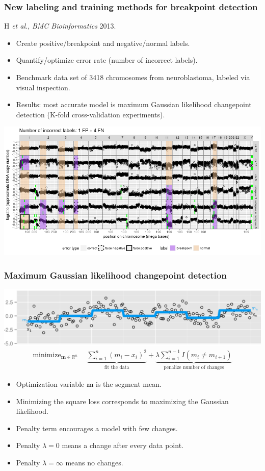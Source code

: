 \documentclass{beamer}
\DeclareMathOperator*{\minimize}{minimize}
\newcommand{\RR}{\mathbb R}
\begin{document}
\begin{frame}
  \frametitle{New labeling and training methods for breakpoint detection}

  H {\it et al.}, {\it BMC Bioinformatics} 2013.
  \begin{itemize}
  \item Create positive/breakpoint and negative/normal labels.
  \item Quantify/optimize error rate (number of incorrect labels).
  \item Benchmark data set of 3418 chromosomes from neuroblastoma,
    labeled via visual inspection.
  \item Results: most accurate model is maximum Gaussian likelihood 
    changepoint detection (K-fold cross-validation experiments).
  \end{itemize}

  \includegraphics[width=\textwidth]{neuroblastoma-ok-relapse-supervised}

\end{frame}

\begin{frame}
  \frametitle{Maximum Gaussian likelihood changepoint detection}

\includegraphics[width=\textwidth]{seg-mean}
\begin{align*}
    \minimize_{
  \mathbf m\in\RR^{n}
} &\ \ 
    \underbrace{
    \sum_{i=1}^n ( m_i - x_i)^2
}_{\text{fit the data}} + 
\underbrace{\lambda
\sum_{i=1}^{n-1} I(m_i\neq m_{i+1})}_{
\text{penalize number of changes}
}
\end{align*}

\begin{itemize}
\item Optimization variable $\mathbf m$ is the segment mean.
\item Minimizing the square loss corresponds to maximizing the
  Gaussian likelihood.
\item Penalty term encourages a model with few changes.
\item Penalty $\lambda=0$ means a change after every data point.
\item Penalty $\lambda=\infty$ means no changes.
\end{itemize}
\end{frame}
\end{document}
